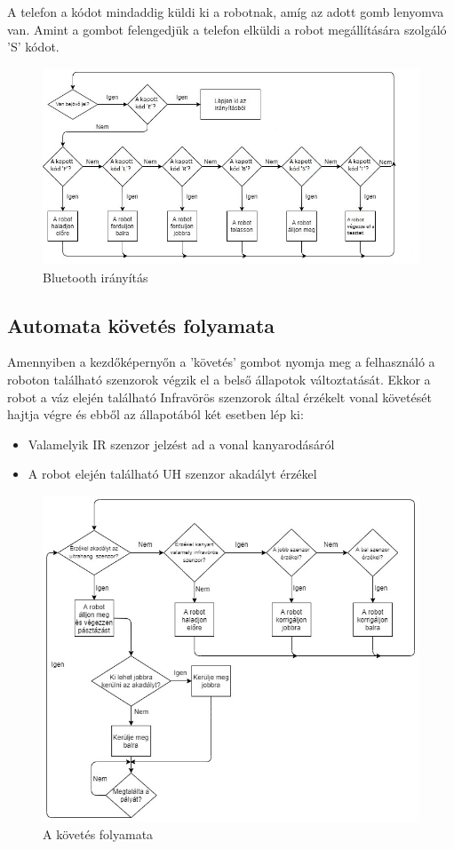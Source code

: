\documentclass[]{thesis-ekf}
\theoremstyle{definition}
\begin{document}
A telefon a kódot mindaddig küldi ki a robotnak, amíg az adott gomb lenyomva van. Amint a gombot felengedjük a telefon elküldi a robot megállítására szolgáló 'S' kódot.
\begin{figure}[h]
	\centering
	\includegraphics[width=\columnwidth]{images/grafok/iranyitas_graf}
	\caption{Bluetooth irányítás}
	\label{iranyitas_graf}
\end{figure}
\subsection{Automata követés folyamata}\label{followkepernyo_allapot}
Amennyiben a kezdőképernyőn a ’követés’ gombot nyomja meg a felhasználó a roboton található szenzorok végzik el a belső állapotok változtatását.
Ekkor a robot a váz elején található Infravörös szenzorok által érzékelt vonal követését hajtja végre és ebből az állapotából két esetben lép ki:
\begin{itemize}
	\item Valamelyik IR szenzor jelzést ad a vonal kanyarodásáról
	\item A robot elején található UH szenzor akadályt érzékel
\end{itemize}
\begin{figure}[h]
	\centering
	\includegraphics[width=\columnwidth]{images/grafok/kovetes_graf}
	\caption{A követés folyamata}
	\label{kovetes_graf}
\end{figure}
\end{document}
